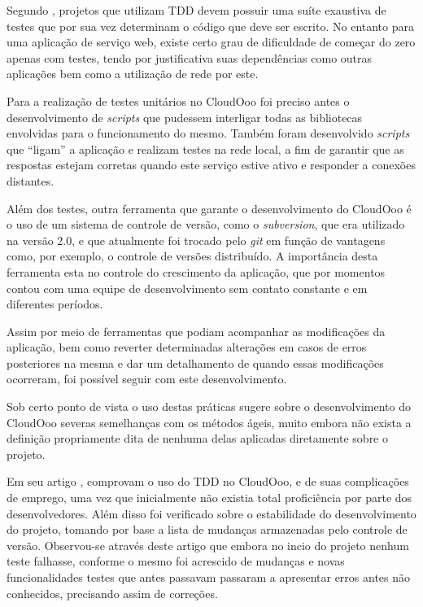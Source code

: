 Segundo , projetos que utilizam TDD devem possuir uma suíte exaustiva de testes que por sua vez determinam o código que deve ser escrito. No entanto para uma aplicação de serviço web, existe certo grau de dificuldade de começar do zero apenas com testes, tendo por justificativa suas dependências como outras aplicações bem como a utilização de rede por este. 

Para a realização de testes unitários no CloudOoo foi preciso antes o desenvolvimento de \textit{scripts} que pudessem interligar todas as bibliotecas envolvidas para o funcionamento do mesmo. Também foram desenvolvido \textit{scripts} que ``ligam'' a aplicação e realizam testes na rede local, a fim de garantir que as respostas estejam corretas quando este serviço estive ativo e responder a conexões distantes.

Além dos testes, outra ferramenta que garante o desenvolvimento do CloudOoo é o uso de um sistema de controle de versão, como o \textit{subversion}, que era utilizado na versão 2.0, e que atualmente foi trocado pelo \textit{git} em função de vantagens como, por exemplo, o controle de versões distribuído. A importância desta ferramenta esta no controle do crescimento da aplicação, que por momentos contou com uma equipe de desenvolvimento sem contato constante e em diferentes períodos.

Assim por meio de ferramentas que podiam acompanhar as modificações da aplicação, bem como reverter determinadas alterações em casos de erros posteriores na mesma e dar um detalhamento de quando essas modificações ocorreram, foi possível seguir com este desenvolvimento.

Sob certo ponto de vista o uso destas práticas sugere sobre o desenvolvimento do CloudOoo severas semelhanças com os métodos ágeis, muito embora não exista a definição propriamente dita de nenhuma delas aplicadas diretamente sobre o projeto.

Em seu artigo , comprovam o uso do TDD no CloudOoo, e de suas complicações de emprego, uma vez que inicialmente não existia total proficiência por parte dos desenvolvedores. Além disso foi verificado sobre o estabilidade do desenvolvimento do projeto, tomando por base a lista de mudanças armazenadas pelo controle de versão. Observou-se através deste artigo que embora no incio do projeto nenhum teste falhasse, conforme o mesmo foi acrescido de mudanças e novas funcionalidades testes que antes passavam passaram a apresentar erros antes não conhecidos, precisando assim de correções.

